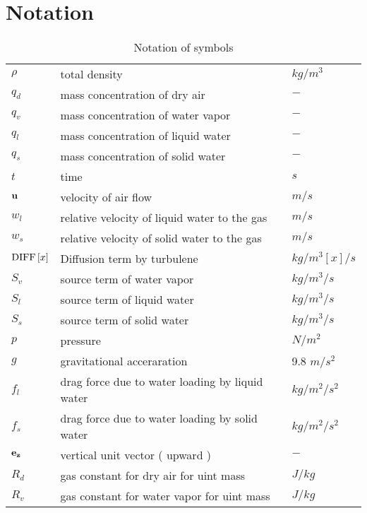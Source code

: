 \chapter{Notation}

\begin{table}[htbp]
  \caption{Notation of symbols}
  \begin{tabular}{lll}\hline
    $\rho$ & total density                       &  $kg/m^3$\\
    $q_d$  & mass concentration of dry air       &  $-$   \\
    $q_v$  & mass concentration of water vapor   &  $-$   \\
    $q_l$  & mass concentration of liquid water &   $-$   \\
    $q_s$  & mass concentration of solid water &    $-$   \\
    $t$    & time                              &   $s$   \\
    ${\bf u}$  & velocity of air flow          &   $m/s$   \\
    $w_l$  & relative velocity of liquid water to the gas    &   $m/s$   \\
    $w_s$  & relative velocity of solid water to the gas    &    $m/s$   \\
    ${\rm DIFF}\left[ x \right]$  & Diffusion term by turbulene  &    $kg/m^3\left[x\right]/s$   \\
    $S_v$    & source term of water vapor                     &    $kg/m^3/s$   \\
    $S_l$    & source term of liquid water                     &   $kg/m^3/s$   \\
    $S_s$    & source term of solid water                     &    $kg/m^3/s$   \\
    $p$      & pressure                                       &   $N/m^2$  \\
    $g$      & gravitational acceraration                     &   9.8 $m/s^2$ \\
    $f_l$      & drag force due to water loading by liquid water  &   $kg /m^2/s^2$ \\
    $f_s$      & drag force due to water loading by solid water   &   $kg /m^2/s^2$ \\
    ${\bf e_z}$ & vertical unit vector ( upward )                 &  $-$ \\
    $R_d$ & gas constant for dry air for uint mass               &  $J/kg$ \\
    $R_v$ & gas constant for water vapor for uint mass               &  $J/kg$ \\

\end{tabular}
\end{table}
